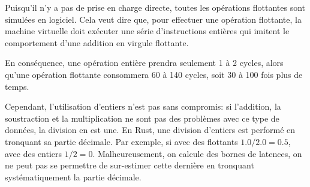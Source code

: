 \documentclass[12pt]{report}
\begin{document}
\medskip

Puisqu'il n'y a pas de prise en charge directe, toutes les opérations
flottantes sont simulées en logiciel. Cela veut dire que, pour effectuer
une opération flottante, la machine virtuelle doit exécuter
une série d'instructions entières qui imitent le comportement d'une addition
en virgule flottante.

\medskip

En conséquence, une opération entière prendra seulement 1 à 2
cycles, alors qu'une opération flottante consommera 60 à 140 cycles,
soit 30 à 100 fois plus de temps.

\medskip

\begin{figure}[h!]
\centering
{}
\end{figure}

\medskip

Cependant, l'utilisation d'entiers n'est pas sans compromis:
si l'addition, la soustraction et la multiplication ne sont pas 
des problèmes avec ce type de données, la division en est une.
En Rust, une division d'entiers est performé en tronquant sa partie
décimale. Par exemple, si avec des flottants $1.0/2.0 = 0.5$,
avec des entiers $1/2 = 0$. Malheureusement, on calcule des bornes de
latences, on ne peut pas se permettre de sur-estimer cette dernière
en tronquant systématiquement la partie décimale.
\end{document}
